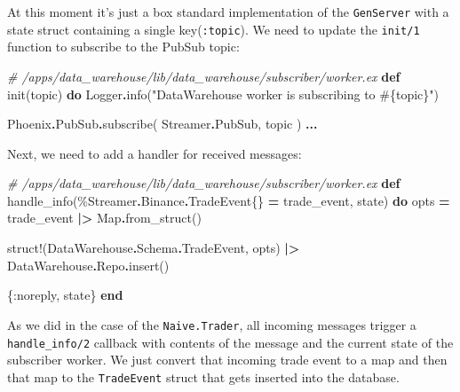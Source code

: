 \documentclass[
  oneside]{book}
\newenvironment{Shaded}{\begin{snugshade}}{\end{snugshade}}
\newcommand{\CommentTok}[1]{\textcolor[rgb]{0.56,0.35,0.01}{\textit{#1}}}
\newcommand{\ConstantTok}[1]{\textcolor[rgb]{0.00,0.00,0.00}{#1}}
\newcommand{\KeywordTok}[1]{\textcolor[rgb]{0.13,0.29,0.53}{\textbf{#1}}}
\newcommand{\NormalTok}[1]{#1}
\newcommand{\OperatorTok}[1]{\textcolor[rgb]{0.81,0.36,0.00}{\textbf{#1}}}
\newcommand{\OtherTok}[1]{\textcolor[rgb]{0.56,0.35,0.01}{#1}}
\newcommand{\StringTok}[1]{\textcolor[rgb]{0.31,0.60,0.02}{#1}}
\newcommand{\VariableTok}[1]{\textcolor[rgb]{0.00,0.00,0.00}{#1}}
\begin{document}
At this moment it's just a box standard implementation of the \texttt{GenServer} with a state struct containing a single key(\texttt{:topic}). We need to update the \texttt{init/1} function to subscribe to the PubSub topic:

\begin{Shaded}
\begin{Highlighting}[]
\CommentTok{\# /apps/data\_warehouse/lib/data\_warehouse/subscriber/worker.ex}
  \KeywordTok{def}\NormalTok{ init(topic) }\KeywordTok{do}
    \ConstantTok{Logger}\OperatorTok{.}\NormalTok{info(}\StringTok{"DataWarehouse worker is subscribing to }\OtherTok{\#\{}\NormalTok{topic}\OtherTok{\}}\StringTok{"}\NormalTok{)}

    \ConstantTok{Phoenix}\OperatorTok{.}\ConstantTok{PubSub}\OperatorTok{.}\NormalTok{subscribe(}
      \ConstantTok{Streamer}\OperatorTok{.}\ConstantTok{PubSub}\NormalTok{,}
\NormalTok{      topic}
\NormalTok{    )}
    \OperatorTok{...}
\end{Highlighting}
\end{Shaded}

Next, we need to add a handler for received messages:

\begin{Shaded}
\begin{Highlighting}[]
\CommentTok{\# /apps/data\_warehouse/lib/data\_warehouse/subscriber/worker.ex}
  \KeywordTok{def}\NormalTok{ handle\_info(\%}\ConstantTok{Streamer}\OperatorTok{.}\ConstantTok{Binance}\OperatorTok{.}\ConstantTok{TradeEvent}\NormalTok{\{\} }\OperatorTok{=}\NormalTok{ trade\_event, state) }\KeywordTok{do}
\NormalTok{    opts }\OperatorTok{=}
\NormalTok{      trade\_event}
      \OperatorTok{|\textgreater{}} \ConstantTok{Map}\OperatorTok{.}\NormalTok{from\_struct()}

\NormalTok{    struct!(}\ConstantTok{DataWarehouse}\OperatorTok{.}\ConstantTok{Schema}\OperatorTok{.}\ConstantTok{TradeEvent}\NormalTok{, opts)}
    \OperatorTok{|\textgreater{}} \ConstantTok{DataWarehouse}\OperatorTok{.}\ConstantTok{Repo}\OperatorTok{.}\NormalTok{insert()}

\NormalTok{    \{}\VariableTok{:noreply}\NormalTok{, state\}}
  \KeywordTok{end}
\end{Highlighting}
\end{Shaded}

As we did in the case of the \texttt{Naive.Trader}, all incoming messages trigger a \texttt{handle\_info/2} callback with contents of the message and the current state of the subscriber worker. We just convert that incoming trade event to a map and then that map to the \texttt{TradeEvent} struct that gets inserted into the database.
\end{document}
